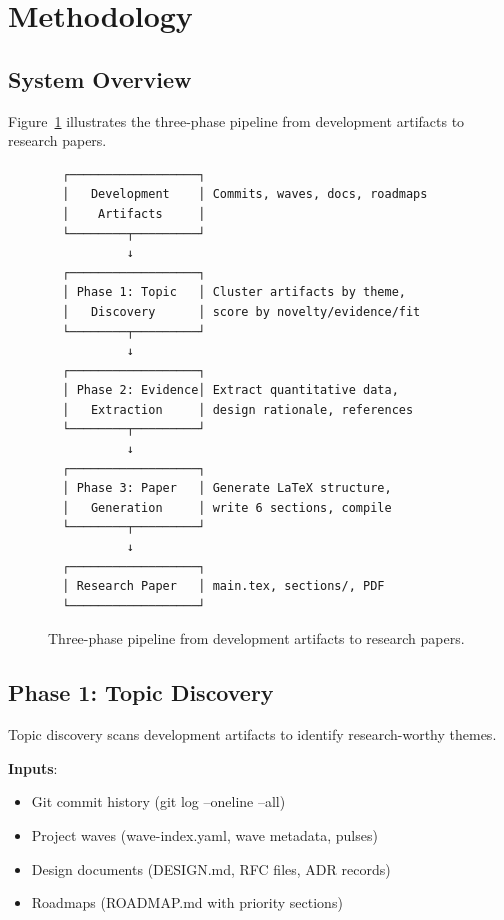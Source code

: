 \section{Methodology}
\label{sec:method}

\subsection{System Overview}

Figure~\ref{fig:pipeline} illustrates the three-phase pipeline from development artifacts to research papers.

\begin{figure}[t]
\centering
\begin{verbatim}
  ┌──────────────────┐
  │   Development    │ Commits, waves, docs, roadmaps
  │    Artifacts     │
  └────────┬─────────┘
           ↓
  ┌──────────────────┐
  │ Phase 1: Topic   │ Cluster artifacts by theme,
  │   Discovery      │ score by novelty/evidence/fit
  └────────┬─────────┘
           ↓
  ┌──────────────────┐
  │ Phase 2: Evidence│ Extract quantitative data,
  │   Extraction     │ design rationale, references
  └────────┬─────────┘
           ↓
  ┌──────────────────┐
  │ Phase 3: Paper   │ Generate LaTeX structure,
  │   Generation     │ write 6 sections, compile
  └────────┬─────────┘
           ↓
  ┌──────────────────┐
  │ Research Paper   │ main.tex, sections/, PDF
  └──────────────────┘
\end{verbatim}
\caption{Three-phase pipeline from development artifacts to research papers.}
\label{fig:pipeline}
\end{figure}

\subsection{Phase 1: Topic Discovery}

Topic discovery scans development artifacts to identify research-worthy themes.

\textbf{Inputs}:
\begin{itemize}
\item Git commit history (git log --oneline --all)
\item Project waves (wave-index.yaml, wave metadata, pulses)
\item Design documents (DESIGN.md, RFC files, ADR records)
\item Roadmaps (ROADMAP.md with priority sections)
\end{itemize}

